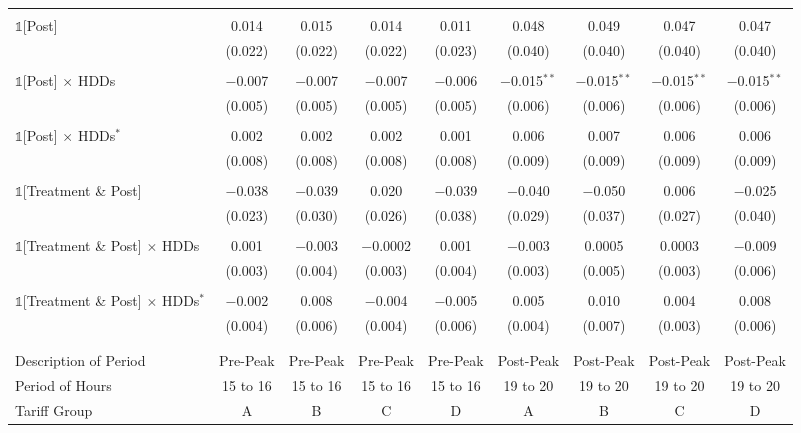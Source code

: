 \begin{table}[!htbp]
\begin{tabular}{@{\extracolsep{10pt}}lcccccccc}
  & & & & & & & & \\ 
 $\mathbb{1}$[Post] & 0.014 & 0.015 & 0.014 & 0.011 & 0.048 & 0.049 & 0.047 & 0.047 \\ 
  & (0.022) & (0.022) & (0.022) & (0.023) & (0.040) & (0.040) & (0.040) & (0.040) \\ 
  & & & & & & & & \\ 
 $\mathbb{1}$[Post] $\times$ HDDs & $-$0.007 & $-$0.007 & $-$0.007 & $-$0.006 & $-$0.015$^{**}$ & $-$0.015$^{**}$ & $-$0.015$^{**}$ & $-$0.015$^{**}$ \\ 
  & (0.005) & (0.005) & (0.005) & (0.005) & (0.006) & (0.006) & (0.006) & (0.006) \\ 
  & & & & & & & & \\ 
 $\mathbb{1}$[Post] $\times$ HDDs$^{*}$ & 0.002 & 0.002 & 0.002 & 0.001 & 0.006 & 0.007 & 0.006 & 0.006 \\ 
  & (0.008) & (0.008) & (0.008) & (0.008) & (0.009) & (0.009) & (0.009) & (0.009) \\ 
  & & & & & & & & \\ 
 $\mathbb{1}$[Treatment \& Post] & $-$0.038 & $-$0.039 & 0.020 & $-$0.039 & $-$0.040 & $-$0.050 & 0.006 & $-$0.025 \\ 
  & (0.023) & (0.030) & (0.026) & (0.038) & (0.029) & (0.037) & (0.027) & (0.040) \\ 
  & & & & & & & & \\ 
 $\mathbb{1}$[Treatment \& Post] $\times$ HDDs & 0.001 & $-$0.003 & $-$0.0002 & 0.001 & $-$0.003 & 0.0005 & 0.0003 & $-$0.009 \\ 
  & (0.003) & (0.004) & (0.003) & (0.004) & (0.003) & (0.005) & (0.003) & (0.006) \\ 
  & & & & & & & & \\ 
 $\mathbb{1}$[Treatment \& Post] $\times$ HDDs$^{*}$ & $-$0.002 & 0.008 & $-$0.004 & $-$0.005 & 0.005 & 0.010 & 0.004 & 0.008 \\ 
  & (0.004) & (0.006) & (0.004) & (0.006) & (0.004) & (0.007) & (0.003) & (0.006) \\ 
  & & & & & & & & \\ 
\hline \\[-1.8ex] 
Description of Period & Pre-Peak & Pre-Peak & Pre-Peak & Pre-Peak & Post-Peak & Post-Peak & Post-Peak & Post-Peak \\ 
Period of Hours & 15 to 16 & 15 to 16 & 15 to 16 & 15 to 16 & 19 to 20 & 19 to 20 & 19 to 20 & 19 to 20 \\ 
Tariff Group & A & B & C & D & A & B & C & D \\ 

\end{tabular}
\end{table}

